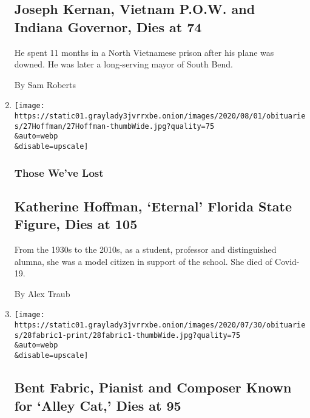 \begin{enumerate}
{  \subsection{Joseph Kernan, Vietnam P.O.W. and Indiana Governor, Dies
  at
  74}\label{joseph-kernan-vietnam-pow-and-indiana-governor-dies-at-74}}

  He spent 11 months in a North Vietnamese prison after his plane was
  downed. He was later a long-serving mayor of South Bend.

  By Sam Roberts
\item
  \href{/2020/07/29/obituaries/katherine-hoffman-dead-coronavirus.html}{}

  \texttt{[image: https://static01.graylady3jvrrxbe.onion/images/2020/08/01/obituaries/27Hoffman/27Hoffman-thumbWide.jpg?quality=75\\\&auto=webp\\\&disable=upscale]}

  \hypertarget{those-weve-lost-1}{%
  \subsubsection{Those We've Lost}\label{those-weve-lost-1}}

  \hypertarget{katherine-hoffman-eternal-florida-state-figure-dies-at-105-1}{%
  \subsection{Katherine Hoffman, `Eternal' Florida State Figure, Dies at
  105}\label{katherine-hoffman-eternal-florida-state-figure-dies-at-105-1}}

  From the 1930s to the 2010s, as a student, professor and distinguished
  alumna, she was a model citizen in support of the school. She died of
  Covid-19.

  By Alex Traub
\item
  \href{/2020/07/29/arts/music/bent-fabric-dead.html}{}

  \texttt{[image: https://static01.graylady3jvrrxbe.onion/images/2020/07/30/obituaries/28fabric1-print/28fabric1-thumbWide.jpg?quality=75\\\&auto=webp\\\&disable=upscale]}

  \hypertarget{bent-fabric-pianist-and-composer-known-for-alley-cat-dies-at-95}{%
  \subsection{Bent Fabric, Pianist and Composer Known for `Alley Cat,'
  Dies at
  95}\label{bent-fabric-pianist-and-composer-known-for-alley-cat-dies-at-95}}


\end{enumerate}
